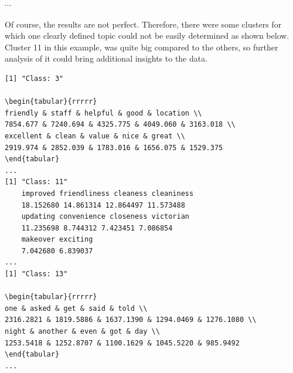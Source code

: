 \documentclass[10pt]{book}
\begin{document}
$\cdots$

Of course, the results are not perfect. Therefore, there were some clusters for which one clearly defined topic could not be easily determined as shown below. Cluster 11 in this example, was quite big compared to the others, so further analysis of it could bring additional insights to the data.

\begin{verbatim}
[1] "Class: 3"

\begin{tabular}{rrrrr} 
friendly & staff & helpful & good & location \\
7854.677 & 7240.694 & 4325.775 & 4049.060 & 3163.018 \\
excellent & clean & value & nice & great \\
2919.974 & 2852.039 & 1783.016 & 1656.075 & 1529.375
\end{tabular}
...
[1] "Class: 11"
    improved friendliness cleaness cleaniness
    18.152680 14.861314 12.864497 11.573488
    updating convenience closeness victorian
    11.235698 8.744312 7.423451 7.086854
    makeover exciting
    7.042680 6.839037
...
[1] "Class: 13"

\begin{tabular}{rrrrr} 
one & asked & get & said & told \\
2316.2821 & 1819.5886 & 1637.1390 & 1294.0469 & 1276.1080 \\
night & another & even & got & day \\
1253.5418 & 1252.8707 & 1100.1629 & 1045.5220 & 985.9492
\end{tabular}
...
\end{verbatim}
\end{document}
